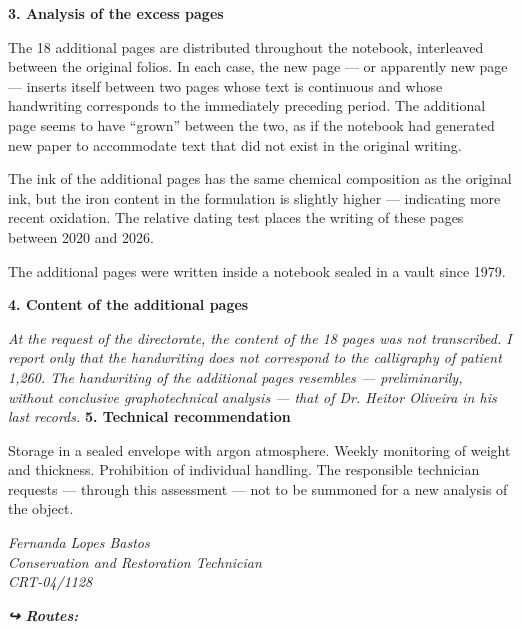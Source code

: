 \noindent \textbf{3. Analysis of the excess pages}

\noindent The 18 additional pages are distributed throughout the notebook, interleaved between the original folios. In each case, the new page --- or apparently new page --- inserts itself between two pages whose text is continuous and whose handwriting corresponds to the immediately preceding period. The additional page seems to have ``grown'' between the two, as if the notebook had generated new paper to accommodate text that did not exist in the original writing.

\noindent The ink of the additional pages has the same chemical composition as the original ink, but the iron content in the formulation is slightly higher --- indicating more recent oxidation. The relative dating test places the writing of these pages between 2020 and 2026.

\noindent The additional pages were written inside a notebook sealed in a vault since 1979.

\noindent \textbf{4. Content of the additional pages}

\noindent \textit{At the request of the directorate, the content of the 18 pages was not transcribed. I report only that the handwriting does not correspond to the calligraphy of patient 1,260. The handwriting of the additional pages resembles --- preliminarily, without conclusive graphotechnical analysis --- that of Dr. Heitor Oliveira in his last records.}
\noindent \textbf{5. Technical recommendation}

\noindent Storage in a sealed envelope with argon atmosphere. Weekly monitoring of weight and thickness. Prohibition of individual handling. The responsible technician requests --- through this assessment --- not to be summoned for a new analysis of the object.

\noindent \textit{Fernanda Lopes Bastos}\\
\noindent \textit{Conservation and Restoration Technician}\\
\noindent \textit{CRT-04/1128}

\vspace{0.5em}
\noindent\textit{\textbf{↪ Routes:}  \rotasep {} \rotasep {}}
